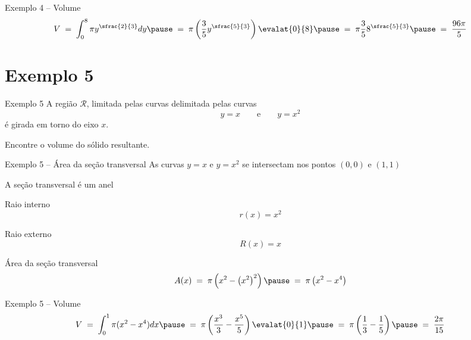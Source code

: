\begin{frame}{Exemplo 4 -- Volume}
  \[
    V
    \;=\; \int_0^8 \pi y^{\sfrac{2}{3}}dy
    \pause
    \;=\; \pi \left( \frac{3}{5} y^{\sfrac{5}{3}}\right) \evalat{0}{8}
    \pause
    \;=\; \pi \frac{3}{5} 8^{\sfrac{5}{3}}
    \pause
    \;=\; \frac{96 \pi}{5}
  \]
\end{frame}

\section{Exemplo 5}

\begin{frame}{Exemplo 5}
A região $\mathcal{R}$, limitada pelas curvas delimitada pelas curvas
\[
  y = x
  \qquad\text{e}\qquad
  y = x^2
\]
é girada em torno do eixo $x$.

\vspace{\baselineskip}
Encontre o volume do sólido resultante.
\end{frame}


\begin{frame}{Exemplo 5 -- Área da seção transversal}
As curvas $y = x$ e $y = x^2$ se intersectam nos pontos $(0, 0)$ e $(1, 1)$

\pause
\vspace{0.5\baselineskip}
A seção transversal é um anel

\pause
\vspace{0.5\baselineskip}
Raio interno
\[
  r(x) = x^2
\]

\pause
Raio externo
\[
  R(x) = x
\]

\pause
Área da seção transversal
\[
  A(x)
  \;=\; \pi \left( x^2 - \left(x^2\right)^2 \right)
  \pause
  \;=\; \pi \left( x^2 - x^4 \right)
\]
\end{frame}

\begin{frame}{Exemplo 5 -- Volume}
  \[
    V
    \;=\; \int_0^1 \pi (x^2-x^4) dx
    \pause
    \;=\; \pi \left( \frac{x^3}{3}-\frac{x^5}{5} \right) \evalat{0}{1}
    \pause
    \;=\; \pi \left( \frac{1}{3} - \frac{1}{5} \right)
    \pause
    \;=\; \frac{2\pi}{15}
  \]
\end{frame}


